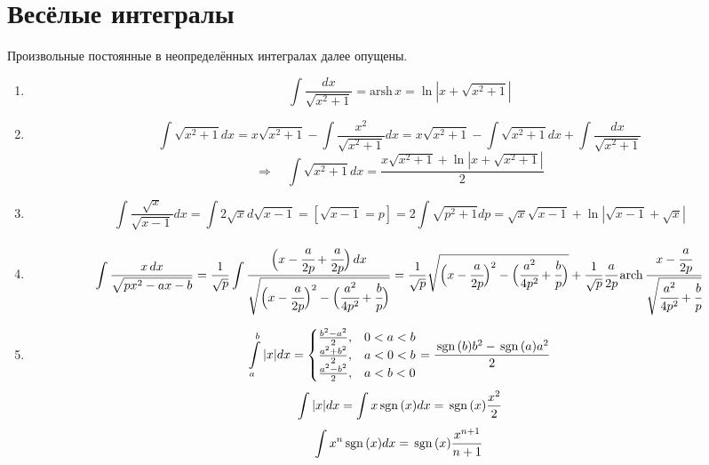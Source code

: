 \section{Весёлые интегралы}
Произвольные постоянные в неопределённых интегралах далее опущены.
\begin{enumerate}
	\item 
	\[
		\int \frac{dx}{\sqrt{x^2 + 1}} = \mathrm{arsh\,}x = \ln |x + \sqrt{x^2 + 1}|
	\]
	\item
	\[
		\int \sqrt{x^2 + 1} dx = 
		x \sqrt{x^2 + 1} - \int \frac{x^2}{\sqrt{x^2 + 1}}dx =
		x \sqrt{x^2 + 1} - \int \sqrt{x^2 + 1}dx + \int \frac{dx}{\sqrt{x^2 + 1}}
	\]
	\[
		\Rightarrow \quad
		\int \sqrt{x^2 + 1} dx = \frac{x \sqrt{x^2 + 1} + \ln |x + \sqrt{x^2 + 1}|}{2}
	\]
	\item
	\[
		\int \frac{\sqrt{x}}{\sqrt{x-1}} dx = 
		\int 2 \sqrt{x} d\sqrt{x-1} =
		[\sqrt{x - 1} = p]
		= 2 \int \sqrt{p^2 + 1} dp = 
		\sqrt{x} \sqrt{x-1}+ \ln |\sqrt{x - 1} + \sqrt{x}|
	\]
	\item
	\[
		\int \frac{x\,dx}{\sqrt{px^2 - ax - b}} = 
		\frac{1}{\sqrt{p}} \int \frac{\Big(x - \cfrac{a}{2p} + \cfrac{a}{2p}\Big)\,dx}{\sqrt{\Big(x - \cfrac{a}{2p}\Big)^2 - \Big(\cfrac{a^2}{4p^2} + \cfrac{b}{p}\Big)}}
		= \frac{1}{\sqrt{p}} \sqrt{\Big(x - \cfrac{a}{2p}\Big)^2 - \Big(\cfrac{a^2}{4p^2} + \cfrac{b}{p}\Big)} + 
		\frac{1}{\sqrt{p}} \cfrac{a}{2p} \,\mathrm{arch\,} \frac{x - \cfrac{a}{2p}}{\sqrt{\cfrac{a^2}{4p^2} + \cfrac{b}{p}}}
	\]
	\item
	\[
		\int\limits_a^b |x| dx = 
		\begin{cases}
		\frac{b^2 - a^2}{2}, & 0 < a < b \\
		\frac{a^2 + b^2}{2}, & a < 0 < b \\
		\frac{a^2 - b^2}{2}, & a < b < 0
		\end{cases}
		=
		\frac{\mathrm{\,sgn}\,(b) b^2 - \mathrm{\,sgn}\,(a) a^2}{2}
	\]
	\[
		\int |x| dx = \int x \mathrm{\,sgn}\, (x) dx = \mathrm{\,sgn}\, (x) \frac{x^2}{2}
	\]
	\[
		\int x^n \mathrm{\,sgn}\, (x) dx = \mathrm{\,sgn}\, (x) \frac{x^{n+1}}{n + 1}
	\]
\end{enumerate}